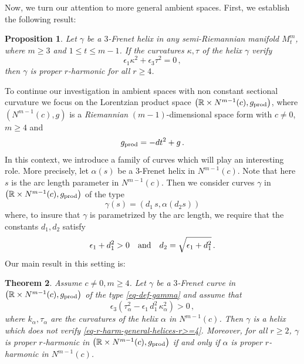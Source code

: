 \documentclass[11pt]{amsart}
\theoremstyle{plain}
\newtheorem{theorem}                {Theorem}      [section]
\newtheorem{proposition}  [theorem]  {Proposition}
\theoremstyle{definition}
\numberwithin{equation}{section}
\def \R{{\mathbb R}}
\begin{document}
Now, we turn our attention to more general ambient spaces.
First, we establish the following result:
\begin{proposition}\label{Th-general-r-harmonicity-3-Frenet-helices}
Let $\gamma$ be a $3$-Frenet helix in any semi-Riemannian manifold $M^m_t$, where $m\geq 3$ and $1\leq t \leq m-1$. If the curvatures $\kappa, \tau$ of the helix $\gamma$ verify
\begin{equation}\label{eq-r-harm-general-helices-r>=4}
\epsilon_1 \kappa^2+\epsilon_3 \tau^2=0\,,
\end{equation}
then $\gamma$ is proper $r$-harmonic for all $r\geq 4$.
\end{proposition}
To continue our investigation in ambient spaces with non constant sectional curvature we focus on the Lorentzian product space $\left ( \R \times N^{m-1}(c),g_{{\rm prod}}\right )$, where $\left (N^{m-1}(c),g \right )$ is a \textit{Riemannian} $(m-1)$-dimensional space form with $c \neq 0$, $m\geq 4$ and 
$$
g_{{\rm prod}}=-dt^2+g\,.
$$ 
In this context, we introduce a family of curves which will play an interesting role. More precisely, let $\alpha(s)$ be a $3$-Frenet helix in $N^{m-1}(c)$. Note that here $s$ is the arc length parameter in $N^{m-1}(c)$. Then we consider curves $\gamma$ in $\left ( \R \times N^{m-1}(c),g_{{\rm prod}}\right )$ of the type
\begin{equation}\label{eq-def-gamma}
\gamma(s)=(d_1\, s, \alpha (d_2 s))
\end{equation}
where, to insure that $\gamma$ is parametrized by the arc length, we require that the constants $d_1,d_2$ satisfy
\begin{equation}\label{eq-d}
\epsilon_1+d_1^2 >0 \quad {\rm and} \quad d_2=\sqrt{\epsilon_1+d_1^2}\,.
\end{equation}
Our main result in this setting is:
\begin{theorem}\label{Th-r-harm-eliche-product-result1}
Assume $c\neq 0, m \geq 4$. Let $\gamma$ be a $3$-Frenet curve in $\left ( \R \times N^{m-1}(c),g_{{\rm prod}}\right )$ of the type \eqref{eq-def-gamma} and assume that
\begin{equation}\label{eq-d-condizione}
\epsilon_3 \left (\tau_\alpha^2-\epsilon_1 \,d_1^2\,\kappa_\alpha^2 \right )>0\,,
\end{equation}
where $k_\alpha,\tau_\alpha$ are the curvatures of the helix $\alpha$ in $N^{m-1}(c)$.
Then $\gamma$ is a helix which does not verify \eqref{eq-r-harm-general-helices-r>=4}.
Moreover, for all $r\geq2$, $\gamma$ is proper $r$-harmonic in $\left ( \R \times N^{m-1}(c),g_{{\rm prod}}\right )$ if and only if $\alpha$ is proper $r$-harmonic in $N^{m-1}(c)$.
\end{theorem}
\end{document}
